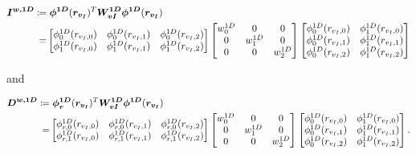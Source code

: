 \documentclass[12pt,Bold,letterpaper,TexShade]{mcgilletdclass}
\numberwithin{equation}{section}
\newcommand{\mat}[1]{\bm{{#1}}}
\newcommand{\vect}[1]{\bm{{#1}}}
\begin{document}
\begin{align*}
\mat{I^{w,1D}}
\coloneqq & \hspace{1mm}
\vect{\phi^{1D}}(\vect{r_{v_I}})^T \mat{W_{vI}^{1D}} \vect{\phi^{1D}}(\vect{r_{v_I}}) \\
= &
\begin{bmatrix}
\phi^{1D}_0(r_{v_I,0}) & \phi^{1D}_0(r_{v_I,1}) & \phi^{1D}_0(r_{v_I,2}) \\
\phi^{1D}_1(r_{v_I,0}) & \phi^{1D}_1(r_{v_I,1}) & \phi^{1D}_1(r_{v_I,2}) \\
\end{bmatrix}
\begin{bmatrix}
w^{1D}_0 & 0 & 0 \\
0 & w^{1D}_1 & 0 \\
0 & 0 & w^{1D}_2 \\
\end{bmatrix}
\begin{bmatrix}
\phi^{1D}_0(r_{v_I,0}) & \phi^{1D}_1(r_{v_I,0}) \\
\phi^{1D}_0(r_{v_I,1}) & \phi^{1D}_1(r_{v_I,1}) \\
\phi^{1D}_0(r_{v_I,2}) & \phi^{1D}_1(r_{v_I,2}) \\
\end{bmatrix}
\end{align*}

and

\begin{align*}
\mat{D^{w,1D}}
\coloneqq & \hspace{1mm}
\vect{\phi^{1D}_r}(\vect{r_{v_I}})^T \mat{W_{vI}^{1D}} \vect{\phi^{1D}}(\vect{r_{v_I}}) \\
= &
\begin{bmatrix}
\phi^{1D}_{r,0}(r_{v_I,0}) & \phi^{1D}_{r,0}(r_{v_I,1}) & \phi^{1D}_{r,0}(r_{v_I,2}) \\
\phi^{1D}_{r,1}(r_{v_I,0}) & \phi^{1D}_{r,1}(r_{v_I,1}) & \phi^{1D}_{r,1}(r_{v_I,2}) \\
\end{bmatrix}
\begin{bmatrix}
w^{1D}_0 & 0 & 0 \\
0 & w^{1D}_1 & 0 \\
0 & 0 & w^{1D}_2 \\
\end{bmatrix}
\begin{bmatrix}
\phi^{1D}_0(r_{v_I,0}) & \phi^{1D}_1(r_{v_I,0}) \\
\phi^{1D}_0(r_{v_I,1}) & \phi^{1D}_1(r_{v_I,1}) \\
\phi^{1D}_0(r_{v_I,2}) & \phi^{1D}_1(r_{v_I,2}) \\
\end{bmatrix}.
\end{align*}
\end{document}

